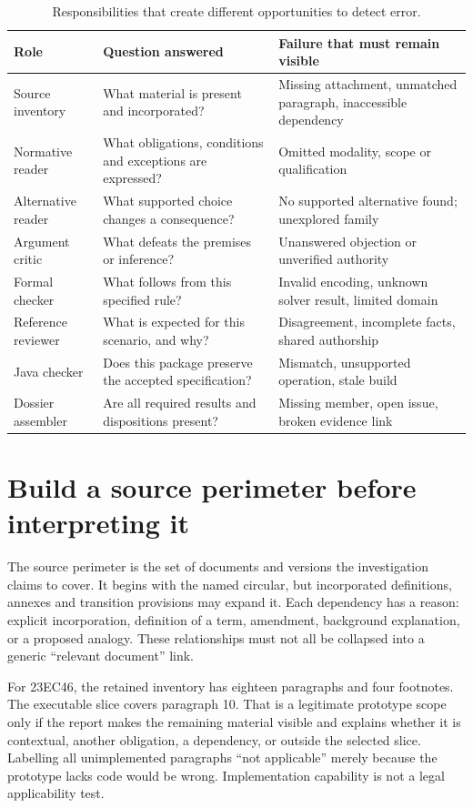 \documentclass[12pt,a4paper,oneside,openany]{book}
\begin{document}
\begin{table}[htbp]
\centering\small
\caption{Responsibilities that create different opportunities to detect error.}
\label{tab:ensemble-roles}
\begin{tabularx}{\textwidth}{P{31mm}YY}
\toprule
Role & Question answered & Failure that must remain visible\\
\midrule
Source inventory & What material is present and incorporated? & Missing attachment, unmatched paragraph, inaccessible dependency\\
Normative reader & What obligations, conditions and exceptions are expressed? & Omitted modality, scope or qualification\\
Alternative reader & What supported choice changes a consequence? & No supported alternative found; unexplored family\\
Argument critic & What defeats the premises or inference? & Unanswered objection or unverified authority\\
Formal checker & What follows from this specified rule? & Invalid encoding, unknown solver result, limited domain\\
Reference reviewer & What is expected for this scenario, and why? & Disagreement, incomplete facts, shared authorship\\
Java checker & Does this package preserve the accepted specification? & Mismatch, unsupported operation, stale build\\
Dossier assembler & Are all required results and dispositions present? & Missing member, open issue, broken evidence link\\
\bottomrule
\end{tabularx}
\end{table}

\section{Build a source perimeter before interpreting it}

The source perimeter is the set of documents and versions the investigation
claims to cover. It begins with the named circular, but incorporated definitions,
annexes and transition provisions may expand it. Each dependency has a reason:
explicit incorporation, definition of a term, amendment, background explanation,
or a proposed analogy. These relationships must not all be collapsed into a
generic ``relevant document'' link.

For 23EC46, the retained inventory has eighteen paragraphs and four footnotes.
The executable slice covers paragraph 10. That is a legitimate prototype scope
only if the report makes the remaining material visible and explains whether it
is contextual, another obligation, a dependency, or outside the selected slice.
Labelling all unimplemented paragraphs ``not applicable'' merely because the
prototype lacks code would be wrong. Implementation capability is not a legal
applicability test.
\end{document}
